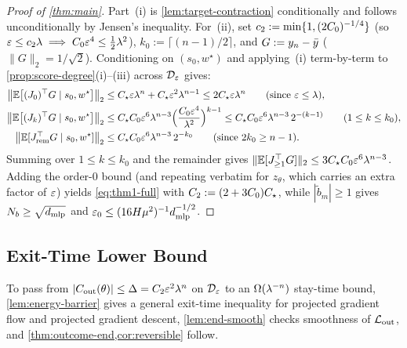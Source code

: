 \begin{proof}[Proof of \cref{thm:main}]
Part~(i) is \cref{lem:target-contraction} conditionally and follows unconditionally by Jensen's inequality. For~(ii), set $c_2 := \min\{1, (2C_0)^{-1/4}\}$ (so $\varepsilon \le c_2\lambda \implies C_0\varepsilon^4 \le \frac{1}{2}\lambda^2$), $k_0 := \lceil(n-1)/2\rceil$, and $G := y_n - \bar y$ ($\|G\|_2 = 1/\sqrt 2$). Conditioning on $(s_0, w^\star)$ and applying~(i) term-by-term to \cref{prop:score-degree}(i)--(iii) across $\mathcal D_{\varepsilon}$ gives:
\begin{align*}
  \bigl\|\mathbb E\bigl[(J_0)^\top G \mid s_0, w^\star\bigr]\bigr\|_2
  &\le C_\star\varepsilon\lambda^n + C_\star\varepsilon^2\lambda^{n-1} \le 2C_\star\varepsilon\lambda^n \qquad (\text{since } \varepsilon \le \lambda),\\
  \bigl\|\mathbb E\bigl[(J_k)^\top G \mid s_0, w^\star\bigr]\bigr\|_2
  &\le C_\star C_0\varepsilon^6\lambda^{n-3}\Bigl(\frac{C_0\varepsilon^4}{\lambda^2}\Bigr)^{k-1}
  \le C_\star C_0\varepsilon^6\lambda^{n-3}\,2^{-(k-1)} \qquad (1 \le k \le k_0),\\
  \bigl\|\mathbb E[J_{\mathrm{rem}}^\top G \mid s_0, w^\star]\bigr\|_2
  &\le C_\star C_0\varepsilon^6\lambda^{n-3}\,2^{-k_0} \qquad (\text{since } 2k_0 \ge n-1).
\end{align*}
Summing over $1 \le k \le k_0$ and the remainder gives $\|\mathbb E[J_{\ge 1}^\top G]\|_2 \le 3C_\star C_0\varepsilon^6\lambda^{n-3}$. Adding the order-$0$ bound (and repeating verbatim for $z_\theta$, which carries an extra factor of $\varepsilon$) yields \cref{eq:thm1-full} with $C_2 := (2 + 3C_0)C_\star$, while $|\tilde b_m| \ge 1$ gives $N_b \ge \sqrt{d_{\mathrm{mlp}}}$ and $\varepsilon_0 \le (16H\mu^2)^{-1}d_{\mathrm{mlp}}^{-1/2}$.
\end{proof}

\subsection{Exit-Time Lower Bound}
\label{app:end}

To pass from $|C_{\mathrm{out}}(\theta)| \le \Delta = C_2\varepsilon^2\lambda^n$ on $\mathcal D_{\varepsilon}$ to an $\Omega(\lambda^{-n})$ stay-time bound, \cref{lem:energy-barrier} gives a general exit-time inequality for projected gradient flow and projected gradient descent, \cref{lem:end-smooth} checks smoothness of $\mathcal L_{\mathrm{out}}$, and \cref{thm:outcome-end,cor:reversible} follow.

